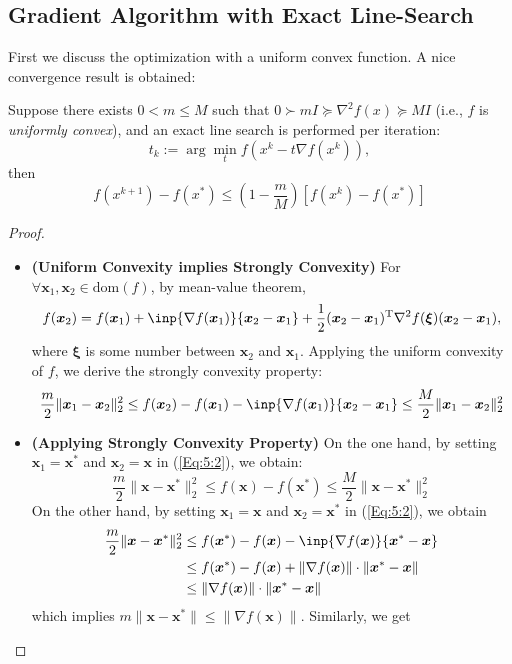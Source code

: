 \subsection{Gradient Algorithm with Exact Line-Search}
First we discuss the optimization with a uniform convex function. A nice convergence result is obtained:
\begin{theorem}
Suppose there exists $0< m\le M$ such that
$0\succ mI\succeq \nabla^2f(x)\succeq MI$ (i.e., $f$ is \emph{uniformly convex}), and an exact line search is performed per iteration:
\[
t_k:=\arg\min_tf(x^k - t\nabla f(x^k)),
\]
then
\begin{equation}\label{Eq:5:1}
f(x^{k+1}) - f(x^*)\le \left(1-\frac{m}{M}\right)[f(x^k) - f(x^*)]
\end{equation}
\end{theorem}
\begin{proof}
\begin{itemize}
\item
\textbf{(Uniform Convexity implies Strongly Convexity)}
For $\forall \bm x_1,\bm x_2\in\text{dom}(f)$, by mean-value theorem,
\[
f(\bm x_2) = f(\bm x_1) + \inp{\nabla f(\bm x_1)}{\bm x_2-\bm x_1} + \frac{1}{2}(\bm x_2-\bm x_1)\trans\nabla^2f(\bm\xi)(\bm x_2-\bm x_1),
\]
where $\bm\xi$ is some number between $\bm x_2$ and $\bm x_1$. Applying the uniform convexity of $f$, we derive the strongly convexity property:
\begin{equation}\label{Eq:5:2}
\frac{m}{2}\|\bm x_1-\bm x_2\|_2^2\le f(\bm x_2)-f(\bm x_1) - \inp{\nabla f(\bm x_1)}{\bm x_2-\bm x_1}\le\frac{M}{2}\|\bm x_1-\bm x_2\|_2^2
\end{equation}
\item
\textbf{(Applying Strongly Convexity Property)}
On the one hand, by setting $\bm x_1 = \bm x^*$ and $\bm x_2 = \bm x$ in (\ref{Eq:5:2}), we obtain:
\begin{equation}
\frac{m}{2}\|\bm x-\bm x^*\|_2^2\le f(\bm x)-f(\bm x^*) \le\frac{M}{2}\|\bm x-\bm x^*\|_2^2
\end{equation}
On the other hand, by setting $\bm x_1 = \bm x$ and $\bm x_2 = \bm x^*$ in (\ref{Eq:5:2}), we obtain
\begin{align*}
\frac{m}{2}\|\bm x-\bm x^*\|_2^2&\le f(\bm x^*)-f(\bm x) - \inp{\nabla f(\bm x)}{\bm x^*-\bm x}\\
&\le f(\bm x^*)-f(\bm x) + \|\nabla f(\bm x)\|\cdot\|\bm x^*-\bm x\|\\
&\le \|\nabla f(\bm x)\|\cdot\|\bm x^*-\bm x\|
\end{align*}
which implies $m\|\bm x-\bm x^*\|\le\|\nabla f(\bm x)\|$. Similarly, we get

\end{itemize}
\end{proof}
